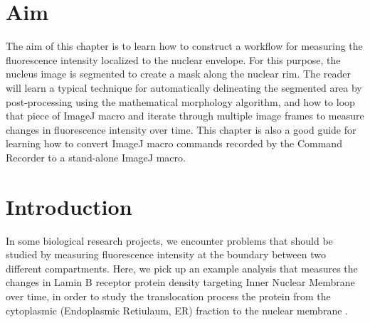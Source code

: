 \setcounter{chapter}{0}


\section{Aim}

The aim of this chapter is to learn how to construct a workflow for measuring the fluorescence intensity localized to the nuclear envelope. For this purpose, the nucleus image is segmented to create a mask along the nuclear rim. The reader will learn a typical technique for automatically delineating the segmented area by post-processing using the mathematical morphology algorithm, and how to loop that piece of ImageJ macro and iterate through multiple image frames to measure changes in fluorescence intensity over time. This chapter is also a good guide for learning how to convert ImageJ macro commands recorded by the Command Recorder to a stand-alone ImageJ macro.  

\section{Introduction}


In some biological research projects, we encounter problems that should be studied by measuring fluorescence intensity at the boundary between two different compartments. Here, we pick up an example analysis that measures the changes in Lamin B receptor protein density targeting Inner Nuclear Membrane over time, in order to study the translocation process the protein from the cytoplasmic (Endoplasmic Retiulaum, ER) fraction to the nuclear membrane \citep{Boni2015}. 

